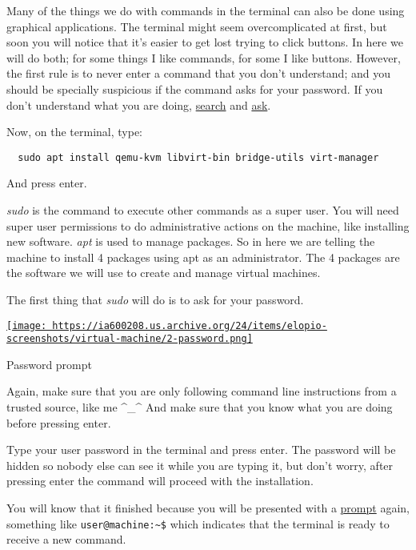 \documentclass[12pt]{article}
\begin{document}
Many of the things we do with commands in the terminal can also be done using
graphical applications. The terminal might seem overcomplicated at first, but
soon you will notice that it's easier to get lost trying to click buttons. In
here we will do both; for some things I like commands, for some I like buttons.
However, the first rule is to never enter a command that you don't understand;
and you should be specially suspicious if the command asks for your password.
If you don't understand what you are doing,
\href{https://lmgtfy.com/?q=sudo}{search} and
\href{https://askubuntu.com/questions/112069/nothing-shows-up-in-the-terminal-when-i-type-my-password}
     {ask}.

Now, on the terminal, type:

\begin{verbatim}
  sudo apt install qemu-kvm libvirt-bin bridge-utils virt-manager
\end{verbatim}

And press enter.

\emph{sudo} is the command to execute other commands as a super user. You will
need super user permissions to do administrative actions on the machine, like
installing new software. \emph{apt} is used to manage packages. So in here
we are telling the machine to install 4 packages using apt as an administrator.
The 4 packages are the software we will use to create and manage virtual
machines.

The first thing that \emph{sudo} will do is to ask for your password.

\begin{center}
  \href{
    https://ia600208.us.archive.org/24/items/elopio-screenshots/virtual-machine/2-password.png}{
    \texttt{[image: 
    https://ia600208.us.archive.org/24/items/elopio-screenshots/virtual-machine/2-password.png]}
  }
  \caption{Password prompt}
\end{center}

Again, make sure that you are only following command line instructions from a
trusted source, like me ^_^ And make sure that you know what you are doing
before pressing enter.

Type your user password in the terminal and press enter. The password will be
hidden so nobody else can see it while you are typing it, but don't worry,
after pressing enter the command will proceed with the installation.

You will know that it finished because you will be presented with a
\href{https://en.wikipedia.org/wiki/Command-line_interface#Command_prompt}
     {prompt} again, something like \verb#user@machine:~$# which  indicates
that the terminal is ready to receive a new command.
\end{document}
